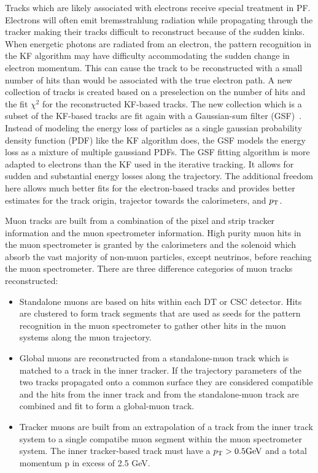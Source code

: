 Tracks which are likely associated with electrons receive special treatment in PF. Electrons
will often emit bremsstrahlung radiation while propagating through the tracker making their
tracks difficult to reconstruct because of the sudden kinks. 
When energetic photons are radiated from an electron, the pattern recognition in the KF algorithm
may have difficulty accommodating the sudden change in electron momentum. This can cause the track to 
be reconstructed with a small number of hits than would be associated with the true electron
path. A new collection of tracks is created based on a preselection on the number of hits and 
the fit $\chi^2$ for the reconstructed KF-based tracks. The new collection which is a subset of the
KF-based tracks are fit again with a Gaussian-sum filter (GSF)~\cite{gsf_electrons}. Instead of
modeling the energy loss of particles as a single gaussian probability density function (PDF) like the KF
algorithm does, the GSF models the energy loss as a mixture of multiple gaussiand PDFs. 
The GSF fitting algorithm is more adapted to electrons than the KF used in the iterative tracking.
It allows for sudden and substantial energy losses along the trajectory. The
additional freedom here allows much better fits for the electron-based tracks and provides
better estimates for the track origin, trajector towards the calorimeters, and $p_\mathrm{T}$.

Muon tracks are built from a combination of the pixel and strip tracker information and the
muon spectrometer information. High purity muon hits in the muon spectrometer is granted by the 
calorimeters and the solenoid which absorb the vast majority of non-muon particles, except neutrinos, 
before reaching the muon spectrometer. There are three difference categories of muon tracks
reconstructed:
\begin{itemize}
\item Standalone muons are based on hits within each DT or CSC detector. Hits are clustered to form 
track segments that are used as seeds for the pattern recognition in the muon spectrometer to gather
other hits in the muon systems along the muon trajectory.
\item Global muons are reconstructed from a standalone-muon track which is matched to a track 
in the inner tracker. If the trajectory parameters of the two tracks propagated onto a common surface 
they are considered compatible and the hits from the inner track and from the standalone-muon track are combined and fit to form a global-muon track.
\item Tracker muons are built from an extrapolation of a track from the inner track system to a
single compatibe muon segment within the muon spectrometer system. The inner tracker-based track must have 
a $p_\mathrm{T} > 0.5\mathrm{GeV}$ and a total momentum p in excess of 2.5 GeV.
\end{itemize}

